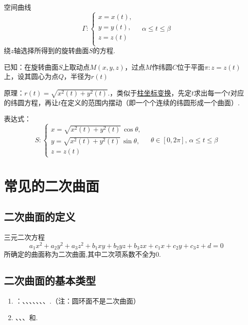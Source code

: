 \theorem[旋转曲面的参数方程]
空间曲线
$$\Gamma:
\begin{cases}
x=x(t),\\
y=y(t),\\
z=z(t)\\
\end{cases}
\quad 
\alpha \le t \le \beta
$$
绕$z$轴选择所得到的旋转曲面$S$的方程.
\par {\color{dy}已知}：在旋转曲面$S$上取动点$M(x,y,z)$，过点$M$作纬圆$C$位于平面$\pi :z=z(t)$上，设其圆心为点$Q$，半径为$r(t)$
\par {\color{dy}原理}：$r(t)=\sqrt{x^2(t)+y^2(t)}.$，类似于\hyperref[柱坐标]{\color{超链接}柱坐标变换}，先定$t$求出每一个$t$对应的纬圆方程，再让$t$在定义的范围内摆动（即一个个连续的纬圆形成一个曲面）.
\par {\color{dy}表达式}：
\begin{equation}
S:
\begin{cases}
x=\sqrt{x^2(t)+y^2(t)}\, \cos \theta,\\
y=\sqrt{x^2(t)+y^2(t)}\, \sin \theta,\\
z=z(t)
\end{cases}
\quad 
\theta \in [0,2\pi],\,
\alpha \le t \le \beta
\end{equation}

\section{常见的二次曲面}
\subsection{二次曲面的定义}
\tdefination[二次曲面]
三元二次方程
\begin{equation}
a_1 x^2 + a_2 y^2 + a_3 z^2 +b_1 xy +b_2 yz+b_3 zx + c_1x+c_2y+c_3z+d=0
\end{equation}
所确定的曲面称为{\color{dy}二次曲面},其中二次项系数不全为$0$.

\jg
\subsection{二次曲面的基本类型}

\begin{enumerate}
	\setlength{\itemindent}{0em}
	\setlength{\topsep}{0.01em}
	\setlength{\itemsep}{0.01em}
	\item  \link[旋转曲面]：\link[球面]、\link[旋转椭球面]、\link[圆柱面]、\link[圆锥面]、\link[旋转椭球面]、\link[旋转单叶双曲面]、\link[旋转双叶双曲面]、\link[旋转抛物面].（注：圆环面不是二次曲面）
	\item  \link[椭球面]、\link[双曲面]、\link[抛物面]、\link[二次锥面]和\link[二次柱面].
\end{enumerate}

